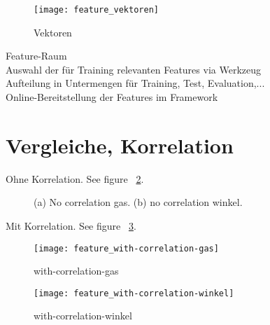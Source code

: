 \begin{figure}[htbp]
\begin{center}
\texttt{[image: feature\_vektoren]}
\caption{Vektoren}
\label{fig:feature_vektoren}
\end{center}
\end{figure}

Feature-Raum\\
Auswahl der für Training relevanten Features via Werkzeug\\
Aufteilung in Untermengen für Training, Test, Evaluation,...\\
Online-Bereitstellung der Features im Framework\\


\section{Vergleiche, Korrelation} %
\label{sec:Vergleiche_Korrelation}
Ohne Korrelation. See figure ~\ref{fig:with-no-correlation}.\\

\begin{figure}[htbp]
\begin{center}
\hspace{1cm}            
\caption{(a) No correlation gas. (b) no correlation winkel.}
\label{fig:with-no-correlation}
\end{center}
\end{figure}

Mit Korrelation. See figure ~\ref{fig:feature_with-correlation-gas}.\\

\begin{figure}[htbp]
\begin{center}
\texttt{[image: feature\_with-correlation-gas]}
\caption{with-correlation-gas}
\label{fig:feature_with-correlation-gas}
\end{center}
\end{figure}

\begin{figure}[htbp]
\begin{center}
\texttt{[image: feature\_with-correlation-winkel]}
\caption{with-correlation-winkel}
\label{fig:feature_with-correlation-winkel}
\end{center}
\end{figure}


